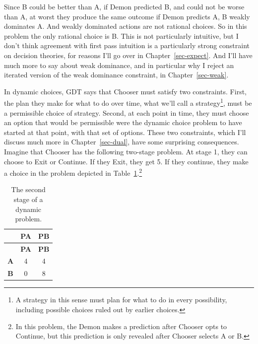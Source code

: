 \documentclass[
  12pt,
  letterpaper,
  DIV=11,
  numbers=noendperiod]{scrreprt}
\begin{document}
Since B could be better than A, if Demon predicted B, and could not be
worse than A, at worst they produce the same outcome if Demon predicts
A, B weakly dominates A. And weakly dominated actions are not rational
choices. So in this problem the only rational choice is B. This is not
particularly intuitive, but I don't think agreement with first pass
intuition is a particularly strong constraint on decision theories, for
reasons I'll go over in Chapter~\ref{sec-expect}. And I'll have much
more to say about weak dominance, and in particular why I reject an
iterated version of the weak dominance constraint, in
Chapter~\ref{sec-weak}.

In dynamic choices, GDT says that Chooser must satisfy two constraints.
First, the plan they make for what to do over time, what we'll call a
strategy\footnote{A strategy in this sense must plan for what to do in
  every possibility, including possible choices ruled out by earlier
  choices.}, must be a permissible choice of strategy. Second, at each
point in time, they must choose an option that would be permissible were
the dynamic choice problem to have started at that point, with that set
of options. These two constraints, which I'll discuss much more in
Chapter~\ref{sec-dual}, have some surprising consequences. Imagine that
Chooser has the following two-stage problem. At stage 1, they can choose
to Exit or Continue. If they Exit, they get 5. If they continue, they
make a choice in the problem depicted in
Table~\ref{tbl-first-dynamic-example}.\footnote{In this problem, the
  Demon makes a prediction after Chooser opts to Continue, but this
  prediction is only revealed after Chooser selects A or B.}

\begin{longtable}[]{@{}ccc@{}}
\caption{The second stage of a dynamic
problem.}\label{tbl-first-dynamic-example}\tabularnewline
\toprule\noalign{}
& \textbf{PA} & \textbf{PB} \\
\midrule\noalign{}
\endfirsthead
\toprule\noalign{}
& \textbf{PA} & \textbf{PB} \\
\midrule\noalign{}
\endhead
\bottomrule\noalign{}
\endlastfoot
\textbf{A} & 4 & 4 \\
\textbf{B} & 0 & 8 \\
\end{longtable}
\end{document}
